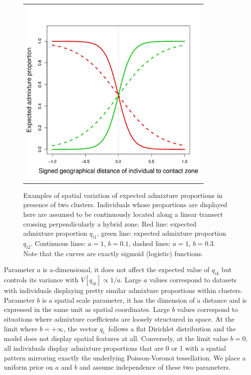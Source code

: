 \documentclass{article}
\begin{document}
\begin{figure}[h]
\begin{tabular}{c}
\vspace{-.1cm}\hspace{3cm} \includegraphics[width=9.5cm]{../inst/images/exp_q_quart.jpeg} \\
\end{tabular}
\caption{Examples of spatial variation of expected admixture proportions in presence of two clusters. 
Individuals whose proportions are displayed here are assumed to be continuously located along a linear 
transect crossing perpendicularly a hybrid zone. 
 Red line: expected admixture proportion $q_{i1}$, 
green line: expected admixture proportion $q_{i2}$. 
Continuous lines: $a=1$, $b=0.1$, dashed lines: $a=1$, $b=0.3$.
Note that the curves are exactly sigmoid (logistic) functions. }\label{fig:exp_q}
\end{figure}

Parameter $a$ is a-dimensional, it does not affect the expected value of  $q_{ik}$ but 
controls its variance  with $V[q_{ik}] \propto 1/a$. 
Large $a$ values correspond to datasets with individuals displaying pretty similar admixture 
proportions within clusters.
Parameter $b$ is a spatial scale parameter, it has the dimension of a distance and is expressed in 
the same unit as spatial coordinates. 
Large $b$ values correspond to situations where admixture coefficients are loosely structured in space. 
At the limit where  $b= +\infty$, 
the vector $q_{i.}$ follows a flat Dirichlet distribution and the model does not display spatial features at all. 
Conversely, at the limit value $b=0$, all individuals display  admixture proportions that are 0 or 1 
with a spatial pattern mirroring exactly 
the underlying Poisson-Voronoi tessellation.
We place a uniform prior on $a$ and $b$ and assume independence of these two parameters.
\end{document}
